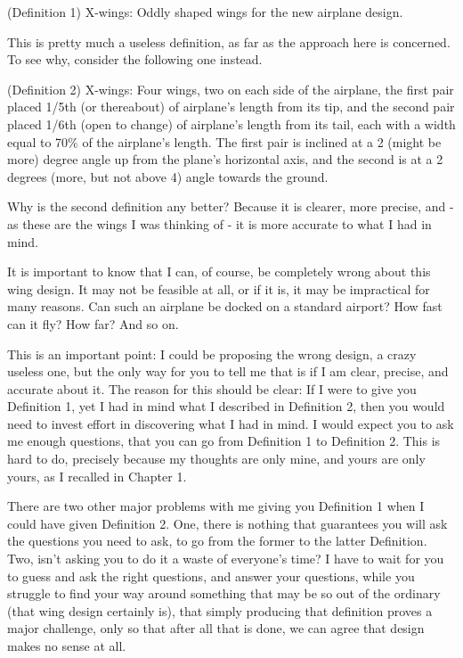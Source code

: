 \begin{svgraybox}
(Definition 1) 
X-wings: Oddly shaped wings for the new airplane design.
\end{svgraybox}

This is pretty much a useless definition, as far as the approach here is concerned. To see why, consider the following one instead.

\begin{svgraybox}
(Definition 2) 
X-wings: Four wings, two on each side of the airplane, the first pair placed 1/5th (or thereabout) of airplane's length from its tip, and the second pair placed 1/6th (open to change) of airplane's length from its tail, each with a width equal to 70\% of the airplane's length. The first pair is inclined at a 2 (might be more) degree angle up from the plane's horizontal axis, and the second is at a 2 degrees (more, but not above 4) angle towards the ground.
\end{svgraybox}

Why is the second definition any better? Because it is clearer, more precise, and - as these are the wings I was thinking of - it is more accurate to what I had in mind. 

It is important to know that I can, of course, be completely wrong about this wing design. It may not be feasible at all, or if it is, it may be impractical for many reasons. Can such an airplane be docked on a standard airport? How fast can it fly? How far? And so on. 

This is an important point: I could be proposing the wrong design, a crazy useless one, but the only way for you to tell me that is if I am clear, precise, and accurate about it. The reason for this should be clear: If I were to give you Definition 1, yet I had in mind what I described in Definition 2, then you would need to invest effort in discovering what I had in mind. I would expect you to ask me enough questions, that you can go from Definition 1 to Definition 2. This is hard to do, precisely because my thoughts are only mine, and yours are only yours, as I recalled in Chapter 1. 

There are two other major problems with me giving you Definition 1 when I could have given Definition 2. One, there is nothing that guarantees you will ask the questions you need to ask, to go from the former to the latter Definition. Two, isn't asking you to do it a waste of everyone's time? I have to wait for you to guess and ask the right questions, and answer your questions, while you struggle to find your way around something that may be so out of the ordinary (that wing design certainly is), that simply producing that definition proves a major challenge, only so that after all that is done, we can agree that design makes no sense at all. 

